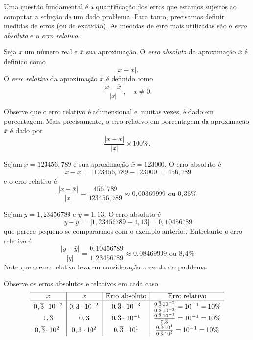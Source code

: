 Uma questão fundamental é a quantificação dos erros que estamos sujeitos ao computar a solução de um dado problema. Para tanto, precisamos definir medidas de erros (ou de exatidão). As medidas de erro mais utilizadas são o \emph{erro absoluto} e o \emph{erro relativo}.

\begin{defn} Seja $x$ um número real e $\overline{x}$ sua aproximação. O \emph{erro absoluto} da aproximação $\overline{x}$ é definido como
  \begin{equation*}
    |x-\overline{x}|.
  \end{equation*}
O \emph{erro relativo} da aproximação $\overline{x}$ é definido como
\begin{equation*}
\frac{|x-\overline{x}|}{|x|},\quad x\neq 0.
\end{equation*}
\end{defn}

\begin{obs}
  Observe que o erro relativo é adimensional e, muitas vezes, é dado em porcentagem. Mais precisamente, o erro relativo em porcentagem da aproximação $\overline{x}$ é dado por
  \begin{equation*}
    \frac{|x-\bar{x}|}{|x|}\times 100 \%.
  \end{equation*}
\end{obs}

\begin{ex}
Sejam $x=123456,789$ e sua aproximação $\bar{x}=123000$. O erro absoluto é
$$
|x-\bar{x}|=|123456,789-123000|=456,789
$$
e o erro relativo é
$$
\frac{|x-\bar{x}|}{|x|}=\frac{456,789}{123456,789}\approx 0,00369999 \text{ ou }0,36\%
$$
\end{ex}

\begin{ex}
Sejam $y=1,23456789$ e $\bar{y}=1,13$. O erro absoluto é
$$
|y-\bar{y}|=|1,23456789-1,13|=0,10456789
$$
que parece pequeno se compararmos com o exemplo anterior. Entretanto o erro relativo é
$$
\frac{|y-\bar{y}|}{|y|}=\frac{0,10456789}{1,23456789}\approx 0,08469999 \text{ ou }8,4\%
$$
Note que o erro relativo leva em consideração a escala do problema.
\end{ex}



\begin{ex}
Observe os erros absolutos e relativos em cada caso
$$
\begin{array}{c|c|c|c} \hline
 x & \bar{x} &\hbox{Erro absoluto}&\hbox{Erro relativo}\\\hline
0,\overline{3}\cdot 10^{-2} & 0,3\cdot 10^{-2}&0,\overline{3}\cdot 10^{-3}&\frac{0,\overline{3}\cdot 10^{-3}}{0,\overline{3}\cdot 10^{-2}}=10^{-1}=10\%\\ 
0,\overline{3}              & 0,3&0,\overline{3}\cdot 10^{-1}&\frac{0,\overline{3}\cdot 10^{-1}}{0,\overline{3}}=10^{-1}=10\%\\ 
0,\overline{3}\cdot 10^{2}\ & 0,3\cdot 10^{2}&0,\overline{3}\cdot 10^{1}&\frac{0,\overline{3}\cdot 10^{1}}{0,\overline{3}\cdot 10^{2}}=10^{-1}=10\%
\end{array}
$$
\end{ex}

